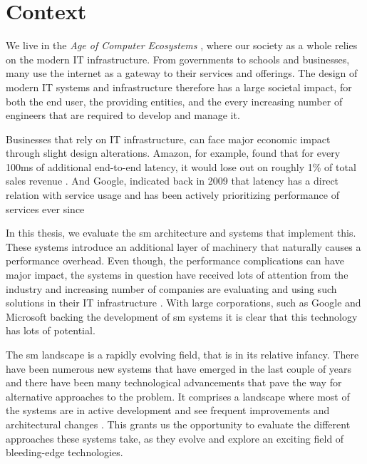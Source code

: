 \section{Context}
\label{sec:introduction:context}





We live in the \textit{Age of Computer Ecosystems} \cite{iosup2018}, where our society as a whole relies on the modern IT infrastructure. From governments to schools and businesses, many use the internet as a gateway to their services and offerings. The design of modern IT systems and infrastructure therefore has a large societal impact, for both the end user, the providing entities, and the every increasing number of engineers \cite{it-employment-worldwide} that are required to develop and manage it.

Businesses that rely on IT infrastructure, can face major economic impact through slight design alterations. Amazon, for example, found that for every 100ms of additional end-to-end latency, it would lose out on roughly 1\% of total sales revenue \cite{amazon-latency-conversion-drop}. And Google, indicated back in 2009 \cite{google-latency-bounce-rate} that latency has a direct relation with service usage and has been actively prioritizing performance of services ever since

In this thesis, we evaluate the \gls{sm} architecture and systems that implement this. These systems introduce an additional layer of machinery that naturally causes a performance overhead. Even though, the performance complications can have major impact, the systems in question have received lots of attention from the industry and increasing number of companies are evaluating and using such solutions in their IT infrastructure \cite{cncf-survey-2021}.  With large corporations, such as Google and Microsoft backing the development of \gls{sm} systems it is clear that this technology has lots of potential. 

The \gls{sm} landscape is a rapidly evolving field, that is in its relative infancy.  There have been numerous new systems that have emerged in the last couple of years and there have been many technological advancements that pave the way for alternative approaches to the problem. It comprises a landscape where most of the systems are in active development and see frequent improvements and architectural changes \cite{istio-merbridge, cilium-mesh}. This grants us the opportunity to evaluate the different approaches these systems take, as they evolve and explore an exciting field of bleeding-edge technologies.

